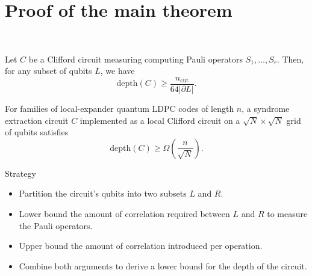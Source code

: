 \section{Proof of the main theorem}

\begin{frame}
  \centering
  \hfill\\
  \begin{theorem}
    Let $C$ be a Clifford circuit measuring computing Pauli operators $S_1, \ldots, S_r$.
    Then, for any subset of qubits $L$, we have
    \begin{equation*}
      \text{depth}(C) 
      \geq
      \frac
        {n_{\text{cut}}}
        {64 |\partial L|}.
    \end{equation*}
  \end{theorem}
  \begin{corollary}
    For families of local-expander quantum LDPC codes of length $n$,
    a syndrome extraction circuit $C$ implemented as a local Clifford circuit 
    on a $\sqrt{N} \times \sqrt{N}$ grid of qubits
    satisfies
    \begin{equation*}
      \text{depth}(C) 
      \geq
      \Omega \left(
        \frac 
          {n}
          {\sqrt{N}}
      \right).
    \end{equation*}
  \end{corollary}
\end{frame}

\begin{frame}{Strategy}
  \hfill\\
  \begin{itemize}
    \item Partition the circuit's qubits into two subsets $L$ and $R$.
    \pause
    \item Lower bound the amount of correlation required between $L$ and $R$ 
    to measure the Pauli operators.
    \pause
    \item Upper bound the amount of correlation introduced per operation.
    \pause
    \item Combine both arguments to derive a lower bound for the depth of the circuit.
  \end{itemize}
\end{frame}

